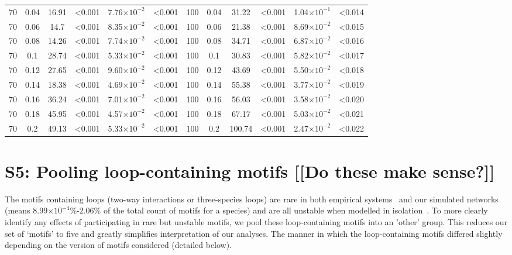 \documentclass[12pt]{article}
\begin{document}
\begin{spacing}{2.0}
\begin{table}[h!]
\begin{tabular}{c c | c c| c c ||c c | c c | c c |}
            70  & 0.04  & 16.91 & \textless0.001  & 7.76$\times10^{-2}$ & \textless0.001  & 100 & 0.04  & 31.22 & \textless0.001  & 1.04$\times10^{-1}$ & \textless0.014  \\
            70  & 0.06  & 14.7  & \textless0.001  & 8.35$\times10^{-2}$ & \textless0.001  & 100 & 0.06  & 21.38 & \textless0.001  & 8.69$\times10^{-2}$ & \textless0.015  \\
            70  & 0.08  & 14.26 & \textless0.001  & 7.74$\times10^{-2}$ & \textless0.001  & 100 & 0.08  & 34.71 & \textless0.001  & 6.87$\times10^{-2}$ & \textless0.016  \\
            70  & 0.1 & 28.74 & \textless0.001  & 5.33$\times10^{-2}$ & \textless0.001  & 100 & 0.1 & 30.83 & \textless0.001  & 5.82$\times10^{-2}$ & \textless0.017  \\
            70  & 0.12  & 27.65 & \textless0.001  & 9.60$\times10^{-2}$ & \textless0.001  & 100 & 0.12  & 43.69 & \textless0.001  & 5.50$\times10^{-2}$ & \textless0.018  \\
            70  & 0.14  & 18.38 & \textless0.001  & 4.69$\times10^{-2}$ & \textless0.001  & 100 & 0.14  & 55.38 & \textless0.001  & 3.77$\times10^{-2}$ & \textless0.019  \\
            70  & 0.16  & 36.24 & \textless0.001  & 7.01$\times10^{-2}$ & \textless0.001  & 100 & 0.16  & 56.03 & \textless0.001  & 3.58$\times10^{-2}$ & \textless0.020  \\
            70  & 0.18  & 45.95 & \textless0.001  & 4.57$\times10^{-2}$ & \textless0.001  & 100 & 0.18  & 67.17 & \textless0.001  & 5.03$\times10^{-2}$ & \textless0.021  \\
            70  & 0.2 & 49.13 & \textless0.001  & 5.33$\times10^{-2}$ & \textless0.001  & 100 & 0.2 & 100.74  & \textless0.001  & 2.47$\times10^{-2}$ & \textless0.022  \\
        \hline
	    \end{tabular}
	    \end{table}


\clearpage


\section*{S5: Pooling loop-containing motifs [[Do these make sense?]]}
	
	The motifs containing loops (two-way interactions or three-species loops) are rare in both empirical systems~\citep{StoufferXXXX} and our simulated networks (means 8.99$\times10^{-4}$\%-2.06\% of the total count of motifs for a species) and are all unstable when modelled in isolation~\citep{BorrelliXXXX}.
	To more clearly identify any effects of participating in rare but unstable motifs, we pool these loop-containing motifs into an 'other' group.
	This reduces our set of `motifs' to five and greatly simplifies interpretation of our analyses.
	The manner in which the loop-containing motifs differed slightly depending on the version of motifs considered (detailed below).



\end{spacing}
\end{document}

